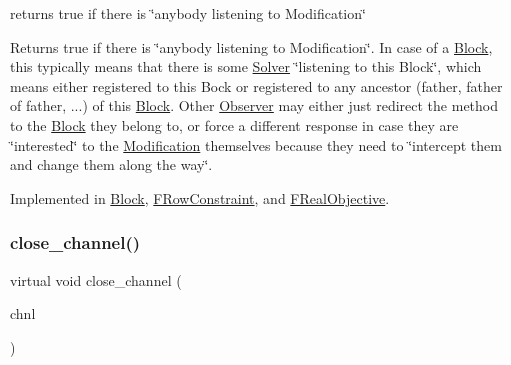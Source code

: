 returns true if there is \char`\"{}anybody listening to Modification\char`\"{} 

Returns true if there is \char`\"{}anybody listening to Modification\char`\"{}. In case of a \mbox{\hyperlink{class_s_m_spp__di__unipi__it_1_1_block}{Block}}, this typically means that there is some \mbox{\hyperlink{class_s_m_spp__di__unipi__it_1_1_solver}{Solver}} \char`\"{}listening to
this Block\char`\"{}, which means either registered to this Bock or registered to any ancestor (father, father of father, ...) of this \mbox{\hyperlink{class_s_m_spp__di__unipi__it_1_1_block}{Block}}. Other \mbox{\hyperlink{class_s_m_spp__di__unipi__it_1_1_observer}{Observer}} may either just redirect the method to the \mbox{\hyperlink{class_s_m_spp__di__unipi__it_1_1_block}{Block}} they belong to, or force a different response in case they are \char`\"{}interested\char`\"{} to the \mbox{\hyperlink{class_s_m_spp__di__unipi__it_1_1_modification}{Modification}} themselves because they need to \char`\"{}intercept them and change
them along the way\char`\"{}. 

Implemented in \mbox{\hyperlink{class_s_m_spp__di__unipi__it_1_1_block_ab59584c81cf3770593fcf1b6371bafff}{Block}}, \mbox{\hyperlink{class_s_m_spp__di__unipi__it_1_1_f_row_constraint_ab59584c81cf3770593fcf1b6371bafff}{F\+Row\+Constraint}}, and \mbox{\hyperlink{class_s_m_spp__di__unipi__it_1_1_f_real_objective_ab59584c81cf3770593fcf1b6371bafff}{F\+Real\+Objective}}.

\mbox{\label{class_s_m_spp__di__unipi__it_1_1_observer_ae807c62016502d692338e1ab6578fc76}} 
\subsubsection{\texorpdfstring{close\+\_\+channel()}{close\_channel()}}
{\footnotesize\ttfamily virtual void close\+\_\+channel (\begin{DoxyParamCaption}\item[{\mbox{\hyperlink{class_s_m_spp__di__unipi__it_1_1_observer_a54ce8db639626e45b1f20c289baa989b}{Chnl\+Name}}}]{chnl }\end{DoxyParamCaption})\hspace{0.3cm}{\ttfamily [pure virtual]}}



